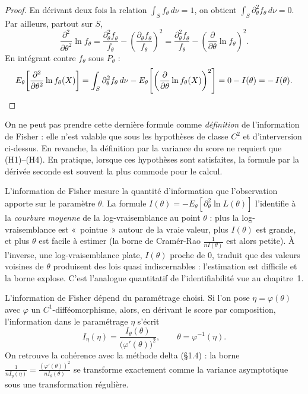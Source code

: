 \begin{proof}
En dérivant deux fois la relation $\int_S f_\theta\, d\nu = 1$, on obtient
$\int_S \partial_\theta^2 f_\theta \, d\nu = 0$. Par ailleurs, partout sur $S$,
\[
  \frac{\partial^{2}}{\partial\theta^{2}} \ln f_\theta
  = \frac{\partial_\theta^{2} f_\theta}{f_\theta}
    - \left( \frac{\partial_\theta f_\theta}{f_\theta} \right)^{2}
  = \frac{\partial_\theta^{2} f_\theta}{f_\theta}
    - \left( \frac{\partial}{\partial\theta} \ln f_\theta \right)^{2}.
\]
En intégrant contre $f_\theta$ sous $P_\theta$ :
\[
  E_\theta\!\left[ \frac{\partial^{2}}{\partial\theta^{2}} \ln f_\theta(X) \right]
  = \int_S \partial_\theta^{2} f_\theta \, d\nu
    - E_\theta\!\left[ \left( \frac{\partial}{\partial\theta} \ln f_\theta(X) \right)^{2} \right]
  = 0 - I(\theta) = -\,I(\theta). \qedhere
\]
\end{proof}

\begin{remarque}
On ne peut pas prendre cette dernière formule comme \emph{définition} de
l'information de Fisher : elle n'est valable que sous les hypothèses de classe
$C^2$ et d'interversion ci-dessus. En revanche, la définition par la variance du
score ne requiert que (H1)--(H4). En pratique, lorsque ces hypothèses sont
satisfaites, la formule par la dérivée seconde est souvent la plus commode pour le
calcul.
\end{remarque}

\begin{remarque}[Interprétation]
L'information de Fisher mesure la quantité d'information que l'observation apporte
sur le paramètre $\theta$. La formule $I(\theta) = -E_\theta[\partial_\theta^{2}
\ln L(\theta)]$ l'identifie à la \emph{courbure moyenne} de la log-vraisemblance au
point $\theta$ : plus la log-vraisemblance est «~pointue~» autour de la vraie
valeur, plus $I(\theta)$ est grande, et plus $\theta$ est facile à estimer (la
borne de Cramér-Rao $\frac{1}{n I(\theta)}$ est alors petite). À l'inverse, une
log-vraisemblance plate, $I(\theta)$ proche de $0$, traduit que des valeurs
voisines de $\theta$ produisent des lois quasi indiscernables : l'estimation est
difficile et la borne explose. C'est l'analogue quantitatif de l'identifiabilité
vue au chapitre~1.
\end{remarque}

\begin{remarque}
L'information de Fisher dépend du paramétrage choisi. Si l'on pose $\eta =
\varphi(\theta)$ avec $\varphi$ un $C^1$-difféomorphisme, alors, en dérivant le
score par composition, l'information dans le paramétrage $\eta$ s'écrit
\[
  I_\eta(\eta) = \frac{I_\theta(\theta)}{\bigl(\varphi'(\theta)\bigr)^{2}},
  \qquad \theta = \varphi^{-1}(\eta).
\]
On retrouve la cohérence avec la méthode delta (\S1.4) : la borne $\frac{1}{n
I_\eta(\eta)} = \frac{(\varphi'(\theta))^{2}}{n I_\theta(\theta)}$ se transforme
exactement comme la variance asymptotique sous une transformation régulière.
\end{remarque}

